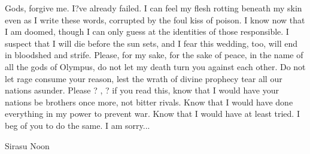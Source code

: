 \documentclass[white]{Kos}
\begin{document}
\name{\wSirasuNote{}}

Gods, forgive me. I?ve already failed. I can feel my flesh rotting beneath my skin even as I write these words, corrupted by the foul kiss of poison. I know now that I am doomed, though I can only guess at the identities of those responsible. I suspect that I will die before the sun sets, and I fear this wedding, too, will end in bloodshed and strife. Please, for my sake, for the sake of peace, in the name of all the gods of Olympus, do not let my death turn you against each other. Do not let rage consume your reason, lest the wrath of divine prophecy tear all our nations asunder. Please ? \cScythiaKing{\Monarch} \cScythiaQueen{\Monarch}, \cEtruriaKing{\Monarch} \cEtruriaKing{} ? if you read this, know that I would have your nations be brothers once more, not bitter rivals. Know that I would have done everything in my power to prevent war. Know that I would have at least tried. I beg of you to do the same. I am sorry...

Sirasu Noon
\end{document}
